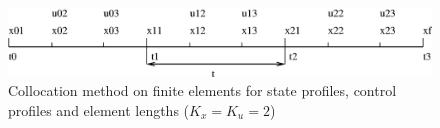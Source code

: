 \begin{figure}
\begin{minipage}[t]{0.95\linewidth}
\centering
{}
\includegraphics[width=1\textwidth]{pictures/collocation.eps}
\caption[Collocation method on finite elements]{Collocation method on
  finite elements for state profiles, control profiles and element
  lengths ($K_{x} = K_{u} = 2$)} 
\label{fig:colloc}
\end{minipage}
\end{figure}

